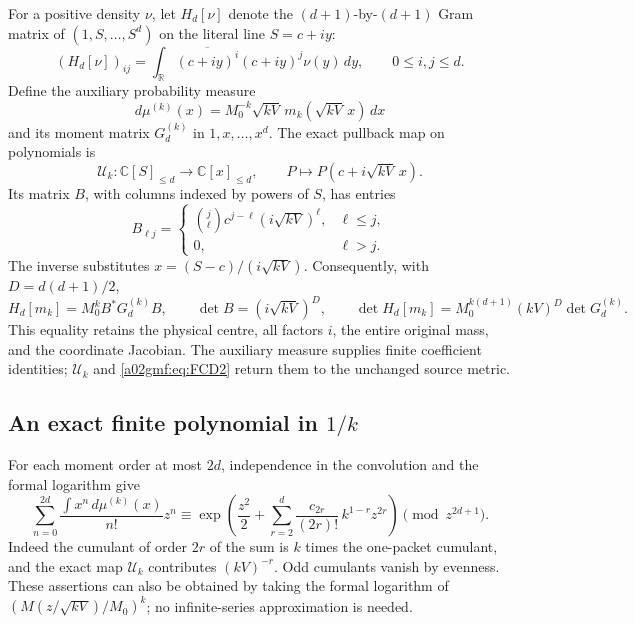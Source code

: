 \documentclass[11pt,a4paper]{article}
\begin{document}
For a positive density \(\nu\), let \(H_d[\nu]\) denote the
\((d+1)\)-by-\((d+1)\) Gram matrix of
\((1,S,\ldots,S^d)\) on the literal line \(S=c+iy\):
\[
 (H_d[\nu])_{ij}
   =\int_{\mathbb R}\overline{(c+iy)^i}(c+iy)^j\nu(y)\,dy,
       \qquad 0\le i,j\le d.
\]
Define the auxiliary probability measure
\[
 d\mu^{(k)}(x)
  =M_0^{-k}\sqrt{kV}\,m_k(\sqrt{kV}\,x)\,dx
\]
and its moment matrix \(G_d^{(k)}\) in \(1,x,\ldots,x^d\).
The exact pullback map on polynomials is
\[
 \mathcal U_k:\mathbb C[S]_{\le d}\longrightarrow\mathbb C[x]_{\le d},
 \qquad P\longmapsto P(c+i\sqrt{kV}\,x).
\]
Its matrix \(B\), with columns indexed by powers of \(S\), has entries
\[
 B_{\ell j}=
 \begin{cases}
 \binom j\ell c^{j-\ell}(i\sqrt{kV})^\ell,&\ell\le j,\\
 0,&\ell>j .
 \end{cases}
\]
The inverse substitutes \(x=(S-c)/(i\sqrt{kV})\).
Consequently, with \(D=d(d+1)/2\),
\begin{equation}
 H_d[m_k]=M_0^kB^*G_d^{(k)}B,\qquad
 \det B=(i\sqrt{kV})^D,\qquad
 \det H_d[m_k]=M_0^{k(d+1)}(kV)^D\det G_d^{(k)} .
 \tag{FCD2}\label{a02gmf:eq:FCD2}
\end{equation}
This equality retains the physical centre, all factors \(i\), the entire
original mass, and the coordinate Jacobian. The auxiliary measure supplies
finite coefficient identities; \(\mathcal U_k\) and \eqref{a02gmf:eq:FCD2}
return them to the unchanged source metric.

\subsection{An exact finite polynomial in \(1/k\)}

For each moment order at most \(2d\), independence in the convolution and
the formal logarithm give
\begin{equation}
 \sum_{n=0}^{2d}\frac{\int x^n\,d\mu^{(k)}(x)}{n!}z^n
 \equiv
 \exp\left(\frac{z^2}{2}
       +\sum_{r=2}^{d}\frac{c_{2r}}{(2r)!}\,
                    k^{1-r}z^{2r}\right)\pmod {z^{2d+1}}.
 \tag{FCD3}\label{a02gmf:eq:FCD3}
\end{equation}
Indeed the cumulant of order \(2r\) of the sum is \(k\) times the
one-packet cumulant, and the exact map \(\mathcal U_k\) contributes
\((kV)^{-r}\). Odd cumulants vanish by evenness. These assertions can
also be obtained by taking the formal logarithm of
\((M(z/\sqrt{kV})/M_0)^k\); no infinite-series approximation is needed.
\end{document}
